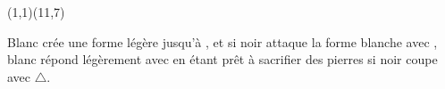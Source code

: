 \documentclass[preview, border=0pt, varwidth=false]{standalone}
\begin{document}
	\setgounit{0.6cm} 
	
\parbox[c][14.65cm][c]{10.2cm}{
	\centering
	
	\begin{psgopartialboard}{(1,1)(11,7)}
		\pass
	\end{psgopartialboard}
	
	\vspace{1em}
	Blanc crée une forme légère jusqu'à , et si noir attaque la forme blanche avec , blanc répond légèrement avec  en étant prêt à sacrifier des pierres si noir coupe avec $\triangle$.
	}
\end{document}

